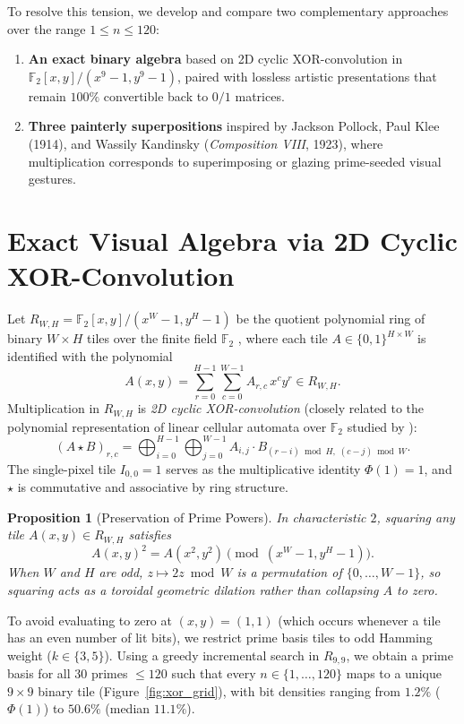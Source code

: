 \documentclass[]{interact}
\theoremstyle{plain}
\newtheorem{proposition}[theorem]{Proposition}
\theoremstyle{definition}
\theoremstyle{remark}
\begin{document}
To resolve this tension, we develop and compare two complementary approaches over the range $1 \le n \le 120$:
\begin{enumerate}
  \item \textbf{An exact binary algebra} based on 2D cyclic XOR-convolution in $\mathbb{F}_2[x,y]/(x^9 - 1, y^9 - 1)$, paired with lossless artistic presentations that remain $100\%$ convertible back to $0/1$ matrices.
  \item \textbf{Three painterly superpositions} inspired by Jackson Pollock, Paul Klee (1914), and Wassily Kandinsky (\emph{Composition VIII}, 1923), where multiplication corresponds to superimposing or glazing prime-seeded visual gestures.
\end{enumerate}

\section{Exact Visual Algebra via 2D Cyclic XOR-Convolution}
Let $R_{W,H} = \mathbb{F}_2[x, y] / (x^W - 1, y^H - 1)$ be the quotient polynomial ring of binary $W \times H$ tiles over the finite field $\mathbb{F}_2$ \citep{lidl1997finite,dummit2003abstract}, where each tile $A \in \{0,1\}^{H \times W}$ is identified with the polynomial
\[
  A(x,y) = \sum_{r=0}^{H-1} \sum_{c=0}^{W-1} A_{r,c}\, x^c y^r \in R_{W,H}.
\]
Multiplication in $R_{W,H}$ is \emph{2D cyclic XOR-convolution} (closely related to the polynomial representation of linear cellular automata over $\mathbb{F}_2$ studied by \citet{martin1984algebraic}):
\begin{equation}
  (A \star B)_{r,c} = \bigoplus_{i=0}^{H-1} \bigoplus_{j=0}^{W-1} A_{i,j} \cdot B_{(r-i)\bmod H,\; (c-j)\bmod W}.
\end{equation}
The single-pixel tile $I_{0,0} = 1$ serves as the multiplicative identity $\Phi(1) = 1$, and $\star$ is commutative and associative by ring structure.

\begin{proposition}[Preservation of Prime Powers]
In characteristic $2$, squaring any tile $A(x,y) \in R_{W,H}$ satisfies
\[
  A(x,y)^2 = A(x^2, y^2) \pmod{(x^W - 1, y^H - 1)}.
\]
When $W$ and $H$ are odd, $z \mapsto 2z \bmod W$ is a permutation of $\{0,\dots,W-1\}$, so squaring acts as a toroidal geometric dilation rather than collapsing $A$ to zero.
\end{proposition}

To avoid evaluating to zero at $(x,y) = (1,1)$ (which occurs whenever a tile has an even number of lit bits), we restrict prime basis tiles to odd Hamming weight ($k \in \{3, 5\}$). Using a greedy incremental search in $R_{9,9}$, we obtain a prime basis for all $30$ primes $\le 120$ such that every $n \in \{1,\dots,120\}$ maps to a unique $9 \times 9$ binary tile (Figure~\ref{fig:xor_grid}), with bit densities ranging from $1.2\%$ ($\Phi(1)$) to $50.6\%$ (median $11.1\%$).
\end{document}
